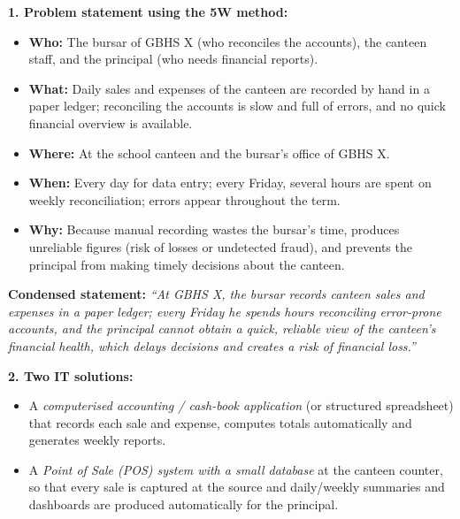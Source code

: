 \documentclass[11pt]{article}
\begin{document}
\begin{corrige}
\textbf{1. Problem statement using the 5W method:}
\begin{itemize}
\item \textbf{Who:} The bursar of GBHS X (who reconciles the accounts), the canteen staff, and the principal (who needs financial reports).
\item \textbf{What:} Daily sales and expenses of the canteen are recorded by hand in a paper ledger; reconciling the accounts is slow and full of errors, and no quick financial overview is available.
\item \textbf{Where:} At the school canteen and the bursar's office of GBHS X.
\item \textbf{When:} Every day for data entry; every Friday, several hours are spent on weekly reconciliation; errors appear throughout the term.
\item \textbf{Why:} Because manual recording wastes the bursar's time, produces unreliable figures (risk of losses or undetected fraud), and prevents the principal from making timely decisions about the canteen.
\end{itemize}
\textbf{Condensed statement:} \emph{``At GBHS X, the bursar records canteen sales and expenses in a paper ledger; every Friday he spends hours reconciling error-prone accounts, and the principal cannot obtain a quick, reliable view of the canteen's financial health, which delays decisions and creates a risk of financial loss.''}

\textbf{2. Two IT solutions:}
\begin{itemize}
\item A \emph{computerised accounting / cash-book application} (or structured spreadsheet) that records each sale and expense, computes totals automatically and generates weekly reports.
\item A \emph{Point of Sale (POS) system with a small database} at the canteen counter, so that every sale is captured at the source and daily/weekly summaries and dashboards are produced automatically for the principal.
\end{itemize}
\end{corrige}
\end{document}
